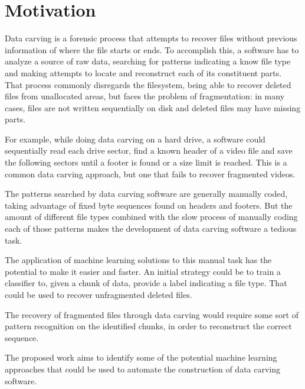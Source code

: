 \section{Motivation}
Data carving is a forensic process that attempts to recover files without previous information of where the file starts or ends.
To accomplish this, a software has to analyze a source of raw data, searching for patterns indicating a know file type and making attempts to locate and reconstruct each of its constituent parts.
That process commonly disregards the filesystem, being able to recover deleted files from unallocated areas, but faces the problem of fragmentation: in many cases, files are not written sequentially on disk and deleted files may have missing parts.

For example, while doing data carving on a hard drive, a software could sequentially read each drive sector, find a known header of a video file and save the following sectors until a footer is found or a size limit is reached. This is a common data carving approach, but one that fails to recover fragmented videos.

The patterns searched by data carving software are generally manually coded, taking advantage of fixed byte sequences found on headers and footers. But the amount of different file types combined with the slow process of manually coding each of those patterns makes the development of data carving software a tedious task.

The application of machine learning solutions to this manual task has the potential to make it easier and faster. An initial strategy could be to train a classifier to, given a chunk of data, provide a label indicating a file type. That could be used to recover unfragmented deleted files.

The recovery of fragmented files through data carving would require some sort of pattern recognition on the identified chunks, in order to reconstruct the correct sequence.

The proposed work aims to identify some of the potential machine learning approaches that could be used to automate the construction of data carving software.

